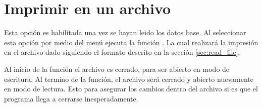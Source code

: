 \section{Imprimir en un archivo}

Esta opción es habilitada una vez se hayan leido los datos base. Al seleccionar esta opción por medio del menú ejecuta la función . La cual realizará la impresión en el archivo dado siguiendo el formato descrito en la sección \ref{sec:read_file}.

Al inicio de la función el archivo es cerrado, para ser abierto en modo de escritura. Al termino de la función, el archivo será cerrado y abierto nuevamente en modo de lectura. Esto para asegurar los cambios dentro del archivo si es que el programa llega a cerrarse inesperadamente.